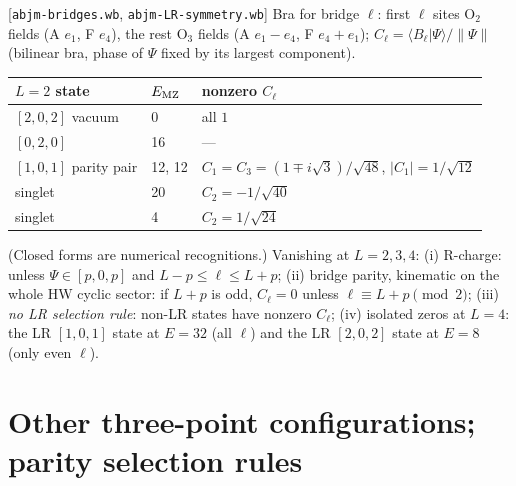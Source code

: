 \documentclass[11pt]{article}
\newcommand{\nb}[1]{\texttt{#1}}
\begin{document}
[\nb{abjm-bridges.wb}, \nb{abjm-LR-symmetry.wb}] Bra for bridge $\ell$: first $\ell$ sites O$_2$ fields (A $e_1$, F $e_4$),
the rest O$_3$ fields (A $e_1-e_4$, F $e_4+e_1$); $C_\ell=\langle B_\ell|\Psi\rangle/\|\Psi\|$ (bilinear bra, phase of $\Psi$ fixed
by its largest component).
\begin{center}
\begin{tabular}{lll}
\toprule
$L=2$ state & $E_{\rm MZ}$ & nonzero $C_\ell$\\
\midrule
$[2,0,2]$ vacuum & 0 & all $1$\\
$[0,2,0]$ & 16 & ---\\
$[1,0,1]$ parity pair & 12, 12 & $C_1=C_3=(1\mp i\sqrt3)/\sqrt{48}$, $|C_1|=1/\sqrt{12}$\\
singlet & 20 & $C_2=-1/\sqrt{40}$\\
singlet & 4 & $C_2=1/\sqrt{24}$\\
\bottomrule
\end{tabular}
\end{center}
(Closed forms are numerical recognitions.) Vanishing at $L=2,3,4$: (i) R-charge: unless $\Psi\in[p,0,p]$ and
$L-p\le\ell\le L+p$; (ii) bridge parity, kinematic on the whole HW cyclic sector: if $L+p$ is odd, $C_\ell=0$ unless
$\ell\equiv L+p\pmod2$; (iii) \emph{no LR selection rule}: non-LR states have nonzero $C_\ell$; (iv) isolated zeros at
$L=4$: the LR $[1,0,1]$ state at $E=32$ (all $\ell$) and the LR $[2,0,2]$ state at $E=8$ (only even $\ell$).

\section{Other three-point configurations; parity selection rules}\label{sec:configs}
\end{document}
